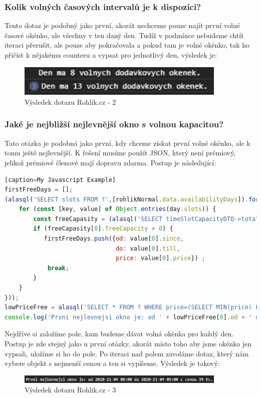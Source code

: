 \documentclass[a4, titlepage]{article}
\begin{document}
\subsubsection{Kolik volných časových intervalů je k dispozici?}
Tento dotaz je podobný jako první, akorát nechceme pouze najít první volné časové okénko, ale všechny v ten daný den. Tudíž v podmínce nebudeme chtít iteraci přerušit, ale pouze aby pokračovala a pokud tam je volné okénko, tak ho přičíst k nějakému counteru a vypsat pro jednotlivý den, výsledek je: 
\begin{figure}[h]
    \centering
    \includegraphics[width=10cm]{R2}
    \caption{Výsledek dotazu Rohlik.cz - 2}
\end{figure}
\newpage

\subsubsection{Jaké je nejbližší nejlevnější okno s volnou kapacitou?}
Tato otázka je podobná jako první, kdy chceme získat první volné okénko, ale k tomu ještě nejlevnější. K řešení musíme použít JSON, který není prémiový, jelikož prémiové členové mají dopravu zdarma. Postup je následující:
\begin{lstlisting}[language=JavaScript][caption=My Javascript Example]
firstFreeDays = [];
(alasql('SELECT slots FROM ?',[rohlikNormal.data.availabilityDays]).forEach(day => {
    for (const [key, value] of Object.entries(day.slots)) {
        const freeCapasity = (alasql('SELECT timeSlotCapacityDTO->totalFreeCapacityPercent AS freeCapacity FROM ?',[value]));
        if (freeCapasity[0].freeCapacity > 0) {
           firstFreeDays.push({od: value[0].since,
                               do: value[0].till,
                               price: value[0].price}) ;
            break;
        }
    }
}));
lowPriceFree = alasql('SELECT * FROM ? WHERE price=(SELECT MIN(price) FROM ?)', [firstFreeDays, firstFreeDays]);
console.log('Prvni nejlevnejsi okno je: od ' + lowPriceFree[0].od + ' do ' + lowPriceFree[0].do + ' s cenou ' + lowPriceFree[0].price + ' Kc.');
\end{lstlisting}
Nejdříve si založíme pole, kam budeme dávat volná okénka pro každý den. Postup je zde stejný jako u první otázky, akorát místo toho aby jsme okénko jen vypsali, uložíme si ho do pole. Po iteraci nad polem zavoláme dotaz, který nám vybere objekt s nejmenší cenou a ten si vypíšeme. Výsledek je takový:
\begin{figure}[h]
    \centering
    \includegraphics[width=10cm]{R3}
    \caption{Výsledek dotazu Rohlik.cz - 3}
\end{figure}
\newpage
\end{document}

